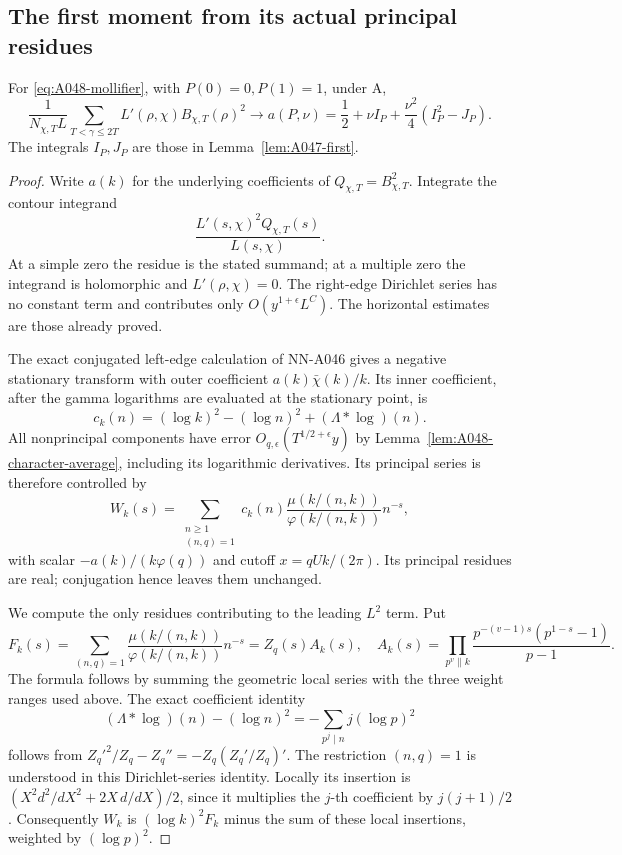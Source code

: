 \subsection*{The first moment from its actual principal residues}

\begin{lemma}
\label{lem:A048-first-constant}
For \eqref{eq:A048-mollifier}, with \(P(0)=0,P(1)=1\),
under A,
\[
 \frac1{N_{\chi,T}L}
  \sum_{T<\gamma\le2T}
       L'(\rho,\chi)B_{\chi,T}(\rho)^2
             \longrightarrow
 a(P,\nu)=\frac12+\nu I_P+
                         \frac{\nu^2}{4}(I_P^2-J_P).
\]
The integrals \(I_P,J_P\) are those in
Lemma~\ref{lem:A047-first}.
\end{lemma}

\begin{proof}
Write \(a(k)\) for the underlying coefficients of
\(Q_{\chi,T}=B_{\chi,T}^2\).
Integrate the contour integrand
\[
                    \frac{L'(s,\chi)^2Q_{\chi,T}(s)}{L(s,\chi)}.
\]
At a simple zero the residue is the stated summand;
at a multiple zero the integrand is holomorphic
and \(L'(\rho,\chi)=0\). The right-edge Dirichlet
series has no constant term and contributes only
\(O(y^{1+\epsilon}L^C)\).
The horizontal estimates are those already proved.

The exact conjugated left-edge calculation of NN-A046
gives a negative stationary transform with outer
coefficient \(a(k)\bar\chi(k)/k\). Its inner coefficient,
after the gamma logarithms are evaluated at the
stationary point, is
\[
 c_k(n)=(\log k)^2-(\log n)^2+
          (\Lambda*\log)(n).
\]
All nonprincipal components have error
\(O_{q,\epsilon}(T^{1/2+\epsilon}y)\) by
Lemma~\ref{lem:A048-character-average}, including
its logarithmic derivatives. Its principal series
is therefore controlled by
\begin{equation}\label{eq:A048-first-residue}
 W_k(s)=\sum_{\substack{n\ge1\\(n,q)=1}}
    c_k(n)\frac{\mu(k/(n,k))}{\varphi(k/(n,k))}n^{-s},
\end{equation}
with scalar \(-a(k)/(k\varphi(q))\) and cutoff
\(x=qUk/(2\pi)\). Its principal residues are real;
conjugation hence leaves them unchanged.

We compute the only residues contributing to the
leading \(L^2\) term. Put
\[
 F_k(s)=\sum_{(n,q)=1}
       \frac{\mu(k/(n,k))}{\varphi(k/(n,k))}n^{-s}
       =Z_q(s)A_k(s),
 \quad
 A_k(s)=\prod_{p^v\parallel k}
       \frac{p^{-(v-1)s}(p^{1-s}-1)}{p-1}.
 \tag{A048.14}\label{eq:A048-Ak}
\]
The formula follows by summing the geometric local
series with the three weight ranges used above.
The exact coefficient identity
\[
 (\Lambda*\log)(n)-(\log n)^2
             =-\sum_{p^j\mid n}j(\log p)^2
\]
follows from
\(Z_q'^2/Z_q-Z_q''=-Z_q(Z_q'/Z_q)'\).
The restriction \((n,q)=1\) is understood in this
Dirichlet-series identity. Locally its insertion is
\((X^2d^2/dX^2+2X\,d/dX)/2\), since it multiplies
the \(j\)-th coefficient by \(j(j+1)/2\).
Consequently \(W_k\) is \( (\log k)^2F_k\) minus
the sum of these local insertions, weighted by
\((\log p)^2\).


\end{proof}
